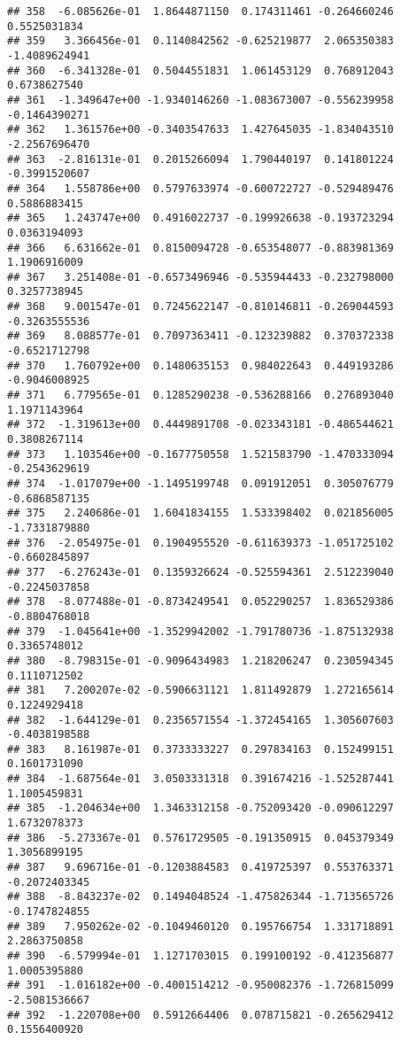 \documentclass[
]{article}
\begin{document}
\begin{verbatim}
## 358  -6.085626e-01  1.8644871150  0.174311461 -0.264660246  0.5525031834
## 359   3.366456e-01  0.1140842562 -0.625219877  2.065350383 -1.4089624941
## 360  -6.341328e-01  0.5044551831  1.061453129  0.768912043  0.6738627540
## 361  -1.349647e+00 -1.9340146260 -1.083673007 -0.556239958 -0.1464390271
## 362   1.361576e+00 -0.3403547633  1.427645035 -1.834043510 -2.2567696470
## 363  -2.816131e-01  0.2015266094  1.790440197  0.141801224 -0.3991520607
## 364   1.558786e+00  0.5797633974 -0.600722727 -0.529489476  0.5886883415
## 365   1.243747e+00  0.4916022737 -0.199926638 -0.193723294  0.0363194093
## 366   6.631662e-01  0.8150094728 -0.653548077 -0.883981369  1.1906916009
## 367   3.251408e-01 -0.6573496946 -0.535944433 -0.232798000  0.3257738945
## 368   9.001547e-01  0.7245622147 -0.810146811 -0.269044593 -0.3263555536
## 369   8.088577e-01  0.7097363411 -0.123239882  0.370372338 -0.6521712798
## 370   1.760792e+00  0.1480635153  0.984022643  0.449193286 -0.9046008925
## 371   6.779565e-01  0.1285290238 -0.536288166  0.276893040  1.1971143964
## 372  -1.319613e+00  0.4449891708 -0.023343181 -0.486544621  0.3808267114
## 373   1.103546e+00 -0.1677750558  1.521583790 -1.470333094 -0.2543629619
## 374  -1.017079e+00 -1.1495199748  0.091912051  0.305076779 -0.6868587135
## 375   2.240686e-01  1.6041834155  1.533398402  0.021856005 -1.7331879880
## 376  -2.054975e-01  0.1904955520 -0.611639373 -1.051725102 -0.6602845897
## 377  -6.276243e-01  0.1359326624 -0.525594361  2.512239040 -0.2245037858
## 378  -8.077488e-01 -0.8734249541  0.052290257  1.836529386 -0.8804768018
## 379  -1.045641e+00 -1.3529942002 -1.791780736 -1.875132938  0.3365748012
## 380  -8.798315e-01 -0.9096434983  1.218206247  0.230594345  0.1110712502
## 381   7.200207e-02 -0.5906631121  1.811492879  1.272165614  0.1224929418
## 382  -1.644129e-01  0.2356571554 -1.372454165  1.305607603 -0.4038198588
## 383   8.161987e-01  0.3733333227  0.297834163  0.152499151  0.1601731090
## 384  -1.687564e-01  3.0503331318  0.391674216 -1.525287441  1.1005459831
## 385  -1.204634e+00  1.3463312158 -0.752093420 -0.090612297  1.6732078373
## 386  -5.273367e-01  0.5761729505 -0.191350915  0.045379349  1.3056899195
## 387   9.696716e-01 -0.1203884583  0.419725397  0.553763371 -0.2072403345
## 388  -8.843237e-02  0.1494048524 -1.475826344 -1.713565726 -0.1747824855
## 389   7.950262e-02 -0.1049460120  0.195766754  1.331718891  2.2863750858
## 390  -6.579994e-01  1.1271703015  0.199100192 -0.412356877  1.0005395880
## 391  -1.016182e+00 -0.4001514212 -0.950082376 -1.726815099 -2.5081536667
## 392  -1.220708e+00  0.5912664406  0.078715821 -0.265629412  0.1556400920

\end{verbatim}
\end{document}
